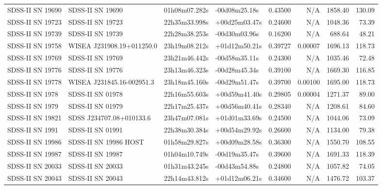 \begin{longtable}{llllrrrr}
SDSS-II SN 19690 &                SDSS-II SN 19690 &   01h08m07.282s &   -00d08m25.18s &  0.43500 &      N/A &  1858.40 &      130.09 \\
SDSS-II SN 19723 &                SDSS-II SN 19723 &   22h35m33.998s &   +00d25m03.47s &  0.24600 &      N/A &  1048.36 &       73.39 \\
SDSS-II SN 19739 &                SDSS-II SN 19739 &   22h28m38.253s &   -00d30m03.96s &  0.16200 &      N/A &   688.64 &       48.21 \\
SDSS-II SN 19758 &       WISEA J231908.19+011250.0 &   23h19m08.212s &   +01d12m50.21s &  0.39727 &  0.00007 &  1696.13 &      118.73 \\
SDSS-II SN 19769 &                SDSS-II SN 19769 &   23h21m46.442s &   -00d58m35.11s &  0.24300 &      N/A &  1035.46 &       72.48 \\
SDSS-II SN 19776 &                SDSS-II SN 19776 &   23h13m46.323s &   -00d28m45.34s &  0.39100 &      N/A &  1669.30 &      116.85 \\
SDSS-II SN 19778 &       WISEA J231845.16-002951.3 &   23h18m45.160s &   -00d29m51.47s &  0.39700 &  0.00100 &  1695.00 &      118.73 \\
SDSS-II SN 1978  &                SDSS-II SN 01978 &   22h16m55.603s &   +00d59m41.40s &  0.29805 &  0.00004 &  1271.37 &       89.00 \\
SDSS-II SN 1979  &                SDSS-II SN 01979 &   22h17m25.437s &   +00d56m40.41s &  0.28340 &      N/A &  1208.61 &       84.60 \\
SDSS-II SN 19821 &        SDSS J234707.08+010133.6 &   23h47m07.081s &   +01d01m33.69s &  0.24500 &      N/A &  1044.06 &       73.09 \\
SDSS-II SN 1991  &                SDSS-II SN 01991 &   22h38m30.384s &   +00d54m29.92s &  0.26600 &      N/A &  1134.00 &       79.38 \\
SDSS-II SN 19986 &           SDSS-II SN 19986 HOST &   01h58m29.827s &   +00d09m28.58s &  0.36300 &      N/A &  1550.70 &      108.55 \\
SDSS-II SN 19987 &                SDSS-II SN 19987 &   01h04m10.749s &   -00d19m35.47s &  0.39600 &      N/A &  1691.33 &      118.39 \\
SDSS-II SN 20033 &                SDSS-II SN 20033 &   01h31m43.245s &   -00d43m54.88s &  0.24800 &      N/A &  1057.82 &       74.05 \\
SDSS-II SN 20043 &                SDSS-II SN 20043 &   22h14m43.812s &   +01d12m06.21s &  0.34600 &      N/A &  1476.72 &      103.37 \\

\end{longtable}
